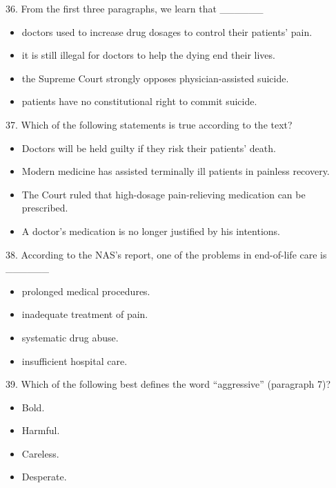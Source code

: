 \documentclass[UTF8,11pt]{ctexart}
\begin{document}
36. From the first three paragraphs, we learn that \_\_\_\_\_\_


\begin{itemize}[leftmargin=2em,itemsep=.2em,topsep=.4em]\item[A.] doctors used to increase drug dosages to control their patients’ pain.
\item[B.] it is still illegal for doctors to help the dying end their lives.
\item[C.] the Supreme Court strongly opposes physician-assisted suicide.
\item[D.] patients have no constitutional right to commit suicide.
\end{itemize}

37. Which of the following statements is true according to the text?


\begin{itemize}[leftmargin=2em,itemsep=.2em,topsep=.4em]\item[A.] Doctors will be held guilty if they risk their patients’ death.
\item[B.] Modern medicine has assisted terminally ill patients in painless recovery.
\item[C.] The Court ruled that high-dosage pain-relieving medication can be prescribed.
\item[D.] A doctor’s medication is no longer justified by his intentions.
\end{itemize}

38. According to the NAS’s report, one of the problems in end-of-life care is \_\_\_\_\_\_


\begin{itemize}[leftmargin=2em,itemsep=.2em,topsep=.4em]\item[A.] prolonged medical procedures.
\item[B.] inadequate treatment of pain.
\item[C.] systematic drug abuse.
\item[D.] insufficient hospital care.
\end{itemize}

39. Which of the following best defines the word “aggressive” (paragraph 7)?


\begin{itemize}[leftmargin=2em,itemsep=.2em,topsep=.4em]\item[A.] Bold.
\item[B.] Harmful.
\item[C.] Careless.
\item[D.] Desperate.
\end{itemize}
\end{document}
